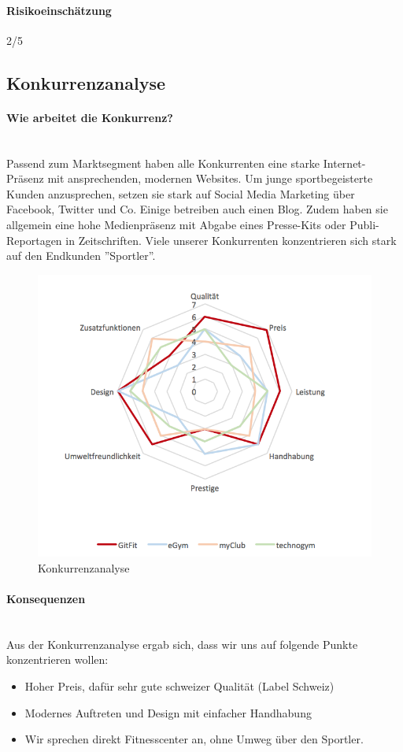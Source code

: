 \paragraph{Risikoeinschätzung} \qquad {} 2/5

\clearpage

\subsection{Konkurrenzanalyse}
\paragraph{Wie arbeitet die Konkurrenz?} \hfill \\
Passend zum Marktsegment haben alle Konkurrenten eine starke Internet-Präsenz mit ansprechenden, modernen Websites. 
Um junge sportbegeisterte Kunden anzusprechen, setzen sie stark auf Social Media Marketing über Facebook, Twitter und Co. Einige betreiben auch einen Blog. Zudem haben sie allgemein eine hohe Medienpräsenz mit Abgabe eines Presse-Kits oder Publi-Reportagen in Zeitschriften. Viele unserer Konkurrenten konzentrieren sich stark auf den Endkunden ''Sportler''.

\begin{figure}[H]
\centering
\includegraphics[width=0.8\linewidth]{images/konkurrenz}
\caption{Konkurrenzanalyse}
\label{fig:konkurrenz}
\end{figure}
\paragraph{Konsequenzen}\hfill \\
Aus der Konkurrenzanalyse ergab sich, dass wir uns auf folgende Punkte konzentrieren wollen:
\begin{itemize}
	\item Hoher Preis, dafür sehr gute schweizer Qualität (Label Schweiz)
	\item Modernes Auftreten und Design mit einfacher Handhabung
	\item Wir sprechen direkt Fitnesscenter an, ohne Umweg über den Sportler.
\end{itemize}

